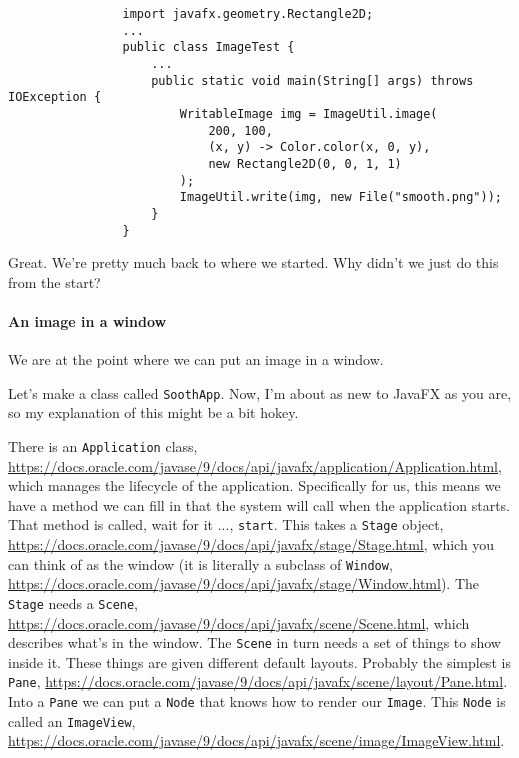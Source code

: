 \documentclass{article}
\begin{document}
            \begin{verbatim}
                import javafx.geometry.Rectangle2D;
                ...
                public class ImageTest {
                    ...
                    public static void main(String[] args) throws IOException {
                        WritableImage img = ImageUtil.image(
                            200, 100,
                            (x, y) -> Color.color(x, 0, y),
                            new Rectangle2D(0, 0, 1, 1)
                        );
                        ImageUtil.write(img, new File("smooth.png"));
                    }
                }
            \end{verbatim}
            
            Great. We're pretty much back to where we started. Why didn't we just do this from the start?
            
        \paragraph{An image in a window}
            We are at the point where we can put an image in a window.
            
            Let's make a class called \texttt{SoothApp}. Now, I'm about as new to JavaFX as you are, so my explanation of this might be a
            bit hokey. 
            
            There is an \texttt{Application} class, \url{https://docs.oracle.com/javase/9/docs/api/javafx/application/Application.html},
            which manages the lifecycle of the application. Specifically for us, this means we have a method we can fill in that the system
            will call when the application starts. That method is called, wait for it ..., \texttt{start}. This takes a \texttt{Stage}
            object, \url{https://docs.oracle.com/javase/9/docs/api/javafx/stage/Stage.html}, which you can think of as the window (it is
            literally a subclass of \texttt{Window}, \url{https://docs.oracle.com/javase/9/docs/api/javafx/stage/Window.html}). The
            \texttt{Stage} needs a \texttt{Scene}, \url{https://docs.oracle.com/javase/9/docs/api/javafx/scene/Scene.html}, which describes
            what's in the window. The \texttt{Scene} in turn needs a set of things to show inside it. These things are given different
            default layouts. Probably the simplest is \texttt{Pane},
            \url{https://docs.oracle.com/javase/9/docs/api/javafx/scene/layout/Pane.html}. Into a \texttt{Pane} we can put a \texttt{Node}
            that knows how to render our \texttt{Image}. This \texttt{Node} is called an \texttt{ImageView},
            \url{https://docs.oracle.com/javase/9/docs/api/javafx/scene/image/ImageView.html}.
            
\end{document}
